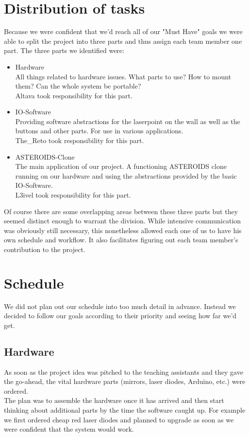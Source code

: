 \documentclass{report}
\begin{document}
\section{Distribution of tasks}\label{distribution}
Because we were confident that we'd reach all of our "Must Have" goals we were able to split the project into three parts and thus assign each team member one part. The three parts we identified were:
\begin{itemize}
	\item Hardware \\
		All things related to hardware issues. What parts to use? How to mount them? Can the whole system be portable? \\
		Altava took responsibility for this part.
	\item IO-Software \\
		Providing software abstractions for the laserpoint on the wall as well as the buttons and other parts. For use in various applications. \\
		The\_Reto took responsibility for this part.
	\item ASTEROIDS-Clone \\
		The main application of our project. A functioning ASTEROIDS clone running on our hardware and using the abstractions provided by the basic IO-Software. \\
		L3ivel took responsibility for this part.
\end{itemize}
Of course there are some overlapping areas between these three parts but they seemed distinct enough to warrant the division. While intensive communication was obviously still necessary, this nonetheless allowed each one of us to have his own schedule and workflow. It also facilitates figuring out each team member's contribution to the project.
\section{Schedule}
We did not plan out our schedule into too much detail in advance. Instead we decided to follow our goals according to their priority and seeing how far we'd get.
\subsection{Hardware}
As soon as the project idea was pitched to the teaching assistants and they gave the go-ahead, the vital hardware parts (mirrors, laser diodes, Arduino, etc.) were ordered. \\
The plan was to assemble the hardware once it has arrived and then start thinking about additional parts by the time the software caught up. For example we first ordered cheap red laser diodes and planned to upgrade as soon as we were confident that the system would work.
\end{document}
